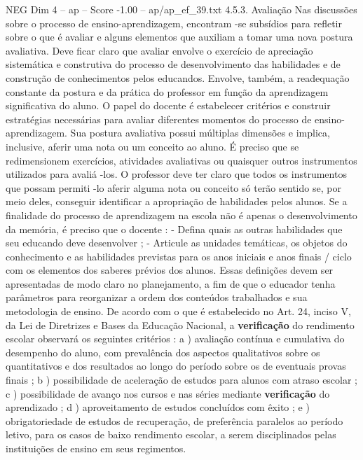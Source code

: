 \begin{textsample}{NEG Dim 4 – ap – Score -1.00 – ap/ap\_ef\_39.txt}  \label{ex:f4_neg_060}
4.5.3.
Avaliação Nas discussões sobre o processo de ensino-aprendizagem, encontram -se subsídios para refletir sobre o que é avaliar e alguns elementos que auxiliam a tomar uma nova postura avaliativa.
Deve ficar claro que avaliar envolve o exercício de apreciação sistemática e construtiva do processo de desenvolvimento das habilidades e de construção de conhecimentos pelos educandos.
Envolve, também, a readequação constante da postura e da prática do professor em função da aprendizagem significativa do aluno.
O papel do docente é estabelecer critérios e construir estratégias necessárias para avaliar diferentes momentos do processo de ensino-aprendizagem.
Sua postura avaliativa possui múltiplas dimensões e implica, inclusive, aferir uma nota ou um conceito ao aluno.
É preciso que se redimensionem exercícios, atividades avaliativas ou quaisquer outros instrumentos utilizados para avaliá -los.
O professor deve ter claro que todos os instrumentos que possam permiti -lo aferir alguma nota ou conceito só terão sentido se, por meio deles, conseguir identificar a apropriação de habilidades pelos alunos.
Se a finalidade do processo de aprendizagem na escola não é apenas o desenvolvimento da memória, é preciso que o docente : - Defina quais as outras habilidades que seu educando deve desenvolver ; - Articule as unidades temáticas, os objetos do conhecimento e as habilidades previstas para os anos iniciais e anos finais / ciclo com os elementos dos saberes prévios dos alunos.
Essas definições devem ser apresentadas de modo claro no planejamento, a fim de que o educador tenha parâmetros para reorganizar a ordem dos conteúdos trabalhados e sua metodologia de ensino.
De acordo com o que é estabelecido no Art. 24, inciso V, da Lei de Diretrizes e Bases da Educação Nacional, a \textbf{verificação} do rendimento escolar observará os seguintes critérios : a ) avaliação contínua e cumulativa do desempenho do aluno, com prevalência dos aspectos qualitativos sobre os quantitativos e dos resultados ao longo do período sobre os de eventuais provas finais ; b ) possibilidade de aceleração de estudos para alunos com atraso escolar ; c ) possibilidade de avanço nos cursos e nas séries mediante \textbf{verificação} do aprendizado ; d ) aproveitamento de estudos concluídos com êxito ; e ) obrigatoriedade de estudos de recuperação, de preferência paralelos ao período letivo, para os casos de baixo rendimento escolar, a serem disciplinados pelas instituições de ensino em seus regimentos.

\end{textsample}
